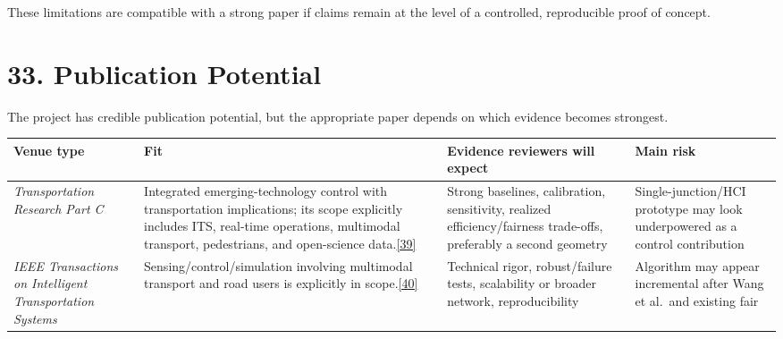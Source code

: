 \documentclass[
  english,
  11pt,
  a4paper,
]{article}
\newcounter{none} %
\begin{document}
These limitations are compatible with a strong paper if claims remain at
the level of a controlled, reproducible proof of concept.

\section{33. Publication Potential}\label{publication-potential}

The project has credible publication potential, but the appropriate
paper depends on which evidence becomes strongest.

{\def\LTcaptype{none} %
\begin{longtable}[]{@{}
  >{\raggedright\arraybackslash}p{}
  >{\raggedright\arraybackslash}p{}
  >{\raggedright\arraybackslash}p{}
  >{\raggedright\arraybackslash}p{}@{}}
\toprule\noalign{}
\begin{minipage}[b]{\linewidth}\raggedright
Venue type
\end{minipage} & \begin{minipage}[b]{\linewidth}\raggedright
Fit
\end{minipage} & \begin{minipage}[b]{\linewidth}\raggedright
Evidence reviewers will expect
\end{minipage} & \begin{minipage}[b]{\linewidth}\raggedright
Main risk
\end{minipage} \\
\midrule\noalign{}
\endhead
\bottomrule\noalign{}
\endlastfoot
\emph{Transportation Research Part C} & Integrated emerging-technology
control with transportation implications; its scope explicitly includes
ITS, real-time operations, multimodal transport, pedestrians, and
open-science data.\hyperref[source-39]{[39]} & Strong baselines,
calibration, sensitivity, realized efficiency/fairness trade-offs,
preferably a second geometry & Single-junction/HCI prototype may look
underpowered as a control contribution \\
\emph{IEEE Transactions on Intelligent Transportation Systems} &
Sensing/control/simulation involving multimodal transport and road users
is explicitly in scope.\hyperref[source-40]{[40]} & Technical rigor,
robust/failure tests, scalability or broader network, reproducibility &
Algorithm may appear incremental after Wang et al.~and existing fair

\end{longtable}}
\end{document}
